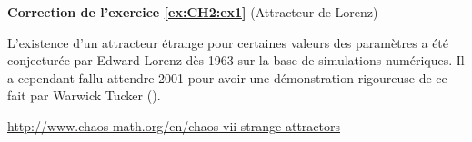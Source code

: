 \documentclass[../../TD/TD_template_CoursIsenLaTeX.tex]{subfiles}
\begin{document}
\textbf{Correction de l'exercice \ref{ex:CH2:ex1} }(Attracteur de Lorenz)

L'existence d'un attracteur étrange pour certaines valeurs des paramètres a été conjecturée par Edward Lorenz dès 1963 sur la base de simulations numériques. Il a cependant fallu attendre 2001 pour avoir une démonstration rigoureuse de ce fait par Warwick Tucker (\cite{tucker2002rigorous}).

\url{http://www.chaos-math.org/en/chaos-vii-strange-attractors}



\end{document}
